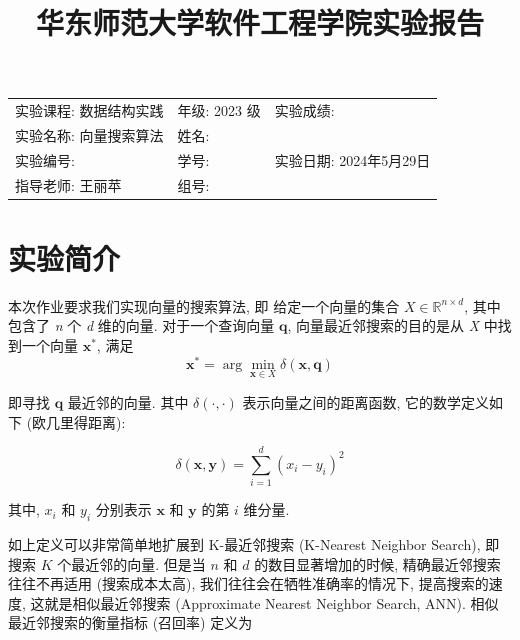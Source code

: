 \documentclass[11pt, UTF8]{article}
\title{华东师范大学软件工程学院实验报告}
\author{}
\date{}
\begin{document}
    \maketitle{}

    \begin{table} [H]
        \centering
        \label{tab:information-table}
        \begin{tabular}{@{}p{}p{}p{}@{}}
            \hline
            实验课程: 数据结构实践 & 年级: 2023 级      & 实验成绩:            \\
            实验名称: 向量搜索算法 & 姓名: &                  \\
            实验编号:        & 学号: & 实验日期: 2024年5月29日 \\
            指导老师: 王丽苹    & 组号:             &                  \\
            \hline
        \end{tabular}
    \end{table}

    \tableofcontents


    \section{实验简介}\label{sec:lab-intro}
    本次作业要求我们实现向量的搜索算法, 即
    给定一个向量的集合 $X \in \mathbb{R}^{n \times d}$, 其中包含了 \textit{n} 个 \textit{d} 维的向量.
    对于一个查询向量 $\mathbf{q}$, 向量最近邻搜索的目的是从 \textit{X} 中找到一个向量 $\mathbf{x}^*$, 满足
    \[ \mathbf{x}^* = \arg\min_{\mathbf{x} \in X} \delta(\mathbf{x}, \mathbf{q}) \]

    即寻找 \(\mathbf{q}\) 最近邻的向量.
    其中 \(\delta(\cdot, \cdot)\) 表示向量之间的距离函数, 它的数学定义如下 (欧几里得距离):

    \[
        \delta(\mathbf{x}, \mathbf{y}) = \sum_{i=1}^{d} (x_i - y_i)^2
    \]

    其中, \(x_i\) 和 \(y_i\) 分别表示 \(\mathbf{x}\) 和 \(\mathbf{y}\) 的第 \(i\) 维分量.

    如上定义可以非常简单地扩展到 K-最近邻搜索 (K-Nearest Neighbor Search), 即搜索 \(K\) 个最近邻的向量.
    但是当 \(n\) 和 \(d\) 的数目显著增加的时候, 精确最近邻搜索往往不再适用 (搜索成本太高), 我们往往会在牺牲准确率的情况下,
    提高搜索的速度, 这就是相似最近邻搜索 (Approximate Nearest Neighbor Search, ANN).
    相似最近邻搜索的衡量指标 (召回率) 定义为
\end{document}
